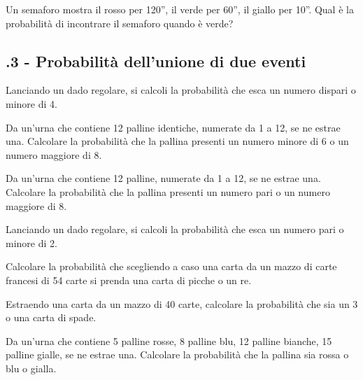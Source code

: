 \begin{esercizio}
 \label{ese:9.27}
Un semaforo mostra il rosso per 120'', il verde per 60'', il giallo per 10''. Qual è la probabilità di incontrare il semaforo quando è verde?
\end{esercizio}

\subsection*{\thechapter.3 - Probabilità dell'unione di due eventi}

\begin{esercizio}[\Ast]
 \label{ese:9.28}
 Lanciando un dado regolare, si calcoli la probabilità che esca un numero dispari o minore di 4.
\end{esercizio}

\begin{esercizio}[\Ast]
 \label{ese:9.29}
Da un'urna che contiene 12 palline identiche, numerate da 1 a 12, se ne estrae una. Calcolare la probabilità che la pallina presenti un numero minore di 6 o un numero maggiore di 8.
\end{esercizio}

\begin{esercizio}[\Ast]
 \label{ese:9.30}
Da un'urna che contiene 12 palline, numerate da 1 a 12, se ne estrae una. Calcolare la probabilità che la pallina presenti un numero pari o un numero maggiore di 8.
\end{esercizio}

\begin{esercizio}[\Ast]
 \label{ese:9.31}
Lanciando un dado regolare, si calcoli la probabilità che esca un numero pari o minore di 2.
\end{esercizio}

\begin{esercizio}[\Ast]
 \label{ese:9.32}
Calcolare la probabilità che scegliendo a caso una carta da un mazzo di carte francesi di 54 carte si prenda una carta di picche o un re.
\end{esercizio}

\begin{esercizio}[\Ast]
 \label{ese:9.33}
Estraendo una carta da un mazzo di 40 carte, calcolare la probabilità che sia un 3 o una carta di spade.
\end{esercizio}

\begin{esercizio}[\Ast]
 \label{ese:9.34}
 Da un'urna che contiene 5 palline rosse, 8 palline blu, 12 palline bianche, 15 palline gialle, se ne estrae una. Calcolare la probabilità che la pallina sia rossa o blu o gialla.
\end{esercizio}

